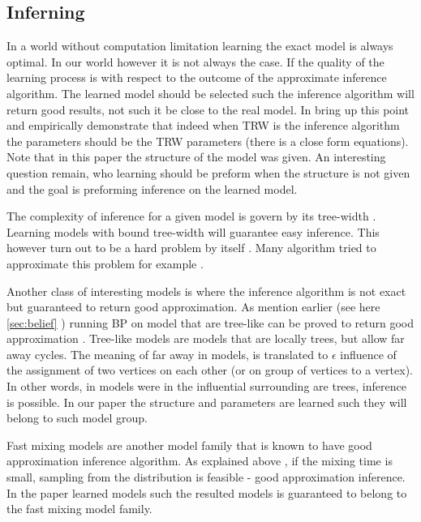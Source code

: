 \subsection{Inferning}
\label{sec:inferning}
In a world without computation limitation learning the exact model is always optimal.
In our world however it is not always the case.
If the quality of the learning process is with respect to the outcome of the approximate inference  algorithm.
The learned model should be selected such the inference algorithm will return good results, not such it be close to the real model.
In \cite{wainwright2006estimating} bring up this point and empirically demonstrate that indeed when TRW is the inference algorithm the parameters should be the TRW parameters (there is a close form equations). 
Note that in this paper the structure of the model was given.
An interesting question remain, who learning should be preform when the structure is not given and the goal is preforming inference on the learned model.

The complexity of inference for a given model is govern by its tree-width \cite{robertson1983graph,robertson1994quickly}.
Learning models with bound tree-width will guarantee easy inference.
This however turn out to be a hard problem by itself \cite{srebro2001maximum}.
Many algorithm tried to approximate this problem for example \cite{karger2001learning,bach2001thin,elidan2009learning}.

Another class of interesting  models is where the inference algorithm is not exact but guaranteed to return good approximation. 
As mention earlier (see here \ref{sec:belief} ) running BP on model that are tree-like can be proved to return good approximation \cite{dembo2010ising}.
Tree-like models are models that are locally trees, but allow far away cycles.
The meaning of far away in models, is translated to $\epsilon$ influence of the assignment of two vertices on each other (or on group of vertices to a vertex).
In other words, in models were in the influential surrounding  are trees, inference is possible.
In our paper \cite{heinemann2014inferning} the structure and parameters are learned such they will belong to such model group.

Fast mixing models are another model family that  is known to have good approximation inference algorithm.
As explained above  , if the mixing time is small, sampling from the distribution is feasible - good approximation inference. 
In the paper \cite{domke2015maximum} learned models such the resulted models is guaranteed to belong to the fast mixing model family.

 
